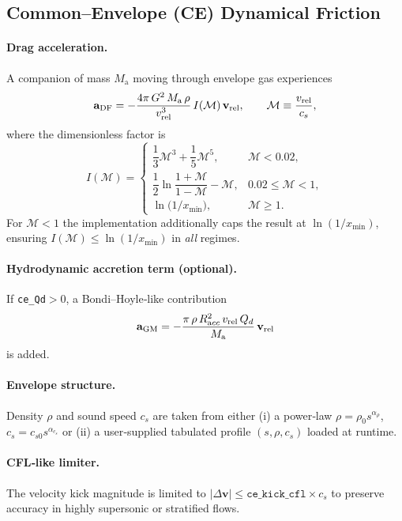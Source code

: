 \documentclass[11pt]{article}
\begin{document}
\subsection{Common–Envelope (CE) Dynamical Friction}
\label{sec:ce_drag}

\paragraph{Drag acceleration.}
A companion of mass $M_{\mathrm a}$ moving through envelope gas experiences
\[
\mathbf a_{\rm DF}=
-\frac{4\pi\,G^2\,M_{\mathrm a}\,\rho}{v_{\rm rel}^3}\,
   I(\mathcal M)\,\mathbf v_{\rm rel},
\qquad
\mathcal M\equiv\frac{v_{\rm rel}}{c_s},
\]
where the dimensionless factor is
\begin{equation}
I(\mathcal M)=
\begin{cases}
\dfrac{1}{3}\mathcal M^3+\dfrac{1}{5}\mathcal M^5,&\mathcal M<0.02,\\[0.6em]
\dfrac{1}{2}\ln\!\dfrac{1+\mathcal M}{1-\mathcal M}-\mathcal M,
 & 0.02\le\mathcal M<1,\\[0.6em]
\ln\!\bigl(1/x_{\min}\bigr),&\mathcal M\ge1.
\end{cases}
\label{eq:I_prefactor}
\end{equation}
For $\mathcal M<1$ the implementation additionally caps the result at
$\ln(1/x_{\min})$,
ensuring $I(\mathcal M)\le\ln(1/x_{\min})$ in \emph{all} regimes.

\paragraph{Hydrodynamic accretion term (optional).}
If \texttt{ce\_Qd}$>$0,
a Bondi–Hoyle‐like contribution
\[
\mathbf a_{\rm GM}
=-\frac{\pi\,\rho\,R_{\mathrm acc}^2\,v_{\rm rel}\,Q_d}{M_{\mathrm a}}
\,\mathbf v_{\rm rel}
\]
is added.

\paragraph{Envelope structure.}
Density $\rho$ and sound speed $c_s$ are taken from either  
(i) a power‑law $\rho=\rho_0s^{\alpha_\rho}$, $c_s=c_{s0}s^{\alpha_{c_s}}$
or  
(ii) a user‑supplied tabulated profile $(s,\rho,c_s)$ loaded at runtime.

\paragraph{CFL‑like limiter.}
The velocity kick magnitude is limited to
$|\Delta\mathbf v|\le\texttt{ce\_kick\_cfl}\times c_s$ to preserve accuracy
in highly supersonic or stratified flows.
\end{document}
